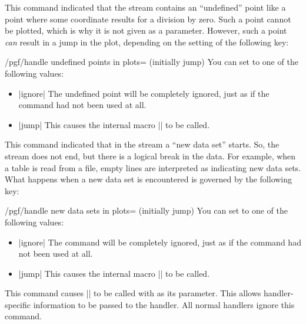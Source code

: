 \begin{command}{\pgfplotstreampointundefined}
  This command indicated that the stream contains an ``undefined''
  point like a point where some coordinate results for a division by
  zero. Such a point cannot be plotted, which is why it is not given
  as a parameter. However, such a point \emph{can} result in a jump in
  the plot, depending on the setting of the following key:
  \begin{key}{/pgf/handle undefined points in plots=
      (initially jump)}
    You can set  to one of the following values:
    \begin{itemize}
    \item |ignore| The undefined point will be completely ignored, just as if
      the command had not been used at all.
    \item |jump| This causes the internal macro |\pgf@plotstreamjump|
      to be called. 
    \end{itemize}
  \end{key}
\end{command}

\begin{command}{\pgfplotstreamnewdataset}
  This command indicated that in the stream a ``new data set'' starts.
  So, the stream does not end, but there is a logical break in the
  data. For example, when a table is read from a file, empty lines are
  interpreted as indicating new data sets. What happens when a new
  data set is encountered is governed by the following key:
  \begin{key}{/pgf/handle new data sets in plots=
      (initially jump)}
    You can set  to one of the following values:
    \begin{itemize}
    \item |ignore| The command will be completely ignored, just as if
      the command had not been used at all.
    \item |jump| This causes the internal macro |\pgf@plotstreamjump|
      to be called. 
    \end{itemize}
  \end{key}
\end{command}

\begin{command}{\pgfplotstreamspecial{}}
  This command causes |\pgf@plotstreamspecial| to be called with
   as its parameter. This allows handler-specific
  information to be passed to the handler. All normal handlers ignore
  this command.
\end{command}

